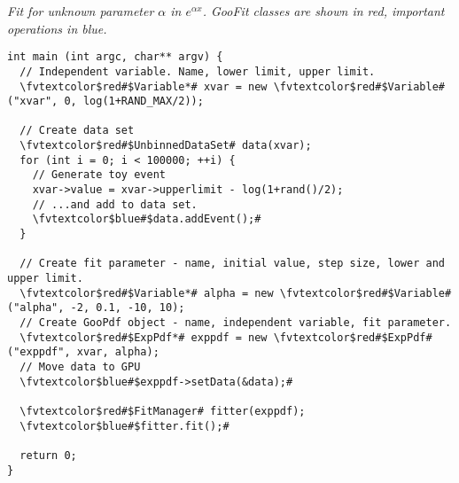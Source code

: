 \begin{listing}
\label{list:expexp} 
\emph{Fit for unknown parameter $\alpha$ in $e^{\alpha x}$. GooFit classes
are shown in red, important operations in blue.}

\begin{Verbatim}[commandchars=\\\$\#]
int main (int argc, char** argv) {
  // Independent variable. Name, lower limit, upper limit. 
  \fvtextcolor$red#$Variable*# xvar = new \fvtextcolor$red#$Variable#("xvar", 0, log(1+RAND_MAX/2)); 
  
  // Create data set
  \fvtextcolor$red#$UnbinnedDataSet# data(xvar);
  for (int i = 0; i < 100000; ++i) {
    // Generate toy event
    xvar->value = xvar->upperlimit - log(1+rand()/2);
    // ...and add to data set. 
    \fvtextcolor$blue#$data.addEvent();# 
  }
  
  // Create fit parameter - name, initial value, step size, lower and upper limit. 
  \fvtextcolor$red#$Variable*# alpha = new \fvtextcolor$red#$Variable#("alpha", -2, 0.1, -10, 10);
  // Create GooPdf object - name, independent variable, fit parameter.
  \fvtextcolor$red#$ExpPdf*# exppdf = new \fvtextcolor$red#$ExpPdf#("exppdf", xvar, alpha); 
  // Move data to GPU
  \fvtextcolor$blue#$exppdf->setData(&data);#

  \fvtextcolor$red#$FitManager# fitter(exppdf);
  \fvtextcolor$blue#$fitter.fit();# 

  return 0;
}
\end{Verbatim}
\end{listing}


